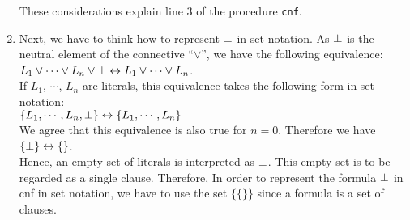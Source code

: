 \begin{enumerate}
      These considerations explain line 3 of the procedure \texttt{cnf}.
\item Next, we have to think how to represent  $\bot$ in set notation.
      As $\bot$ is the neutral element of the connective ``$\vee$'', we have the following
      equivalence: \\[0.2cm]
      \hspace*{1.3cm} 
      $L_1 \vee \cdots \vee L_n \vee \bot \leftrightarrow  L_1 \vee \cdots \vee L_n$.
      \\[0.2cm]
      If  $L_1$, $\cdots$, $L_n$ are literals, this equivalence takes the following form in set
      notation: 
      \\[0.2cm]
      \hspace*{1.3cm} 
      $\{ L_1, \cdots, L_n, \bot \} \leftrightarrow \{ L_1, \cdots, L_n \}$
      \\[0.2cm]
      We agree that this equivalence is also true for $n = 0$.  Therefore we have
      \\[0.2cm]
      \hspace*{1.3cm} $\{\bot \} \leftrightarrow \{\}$. \\[0.2cm]
      Hence, an empty set of literals is interpreted as $\bot$.  This empty set is to be regarded
      as a single clause.  Therefore, In order to represent the formula  $\bot$ in cnf in set
      notation, we have to use the set $\bigl\{ \{\} \bigr\}$ since a formula is a set of clauses.


\end{enumerate}
